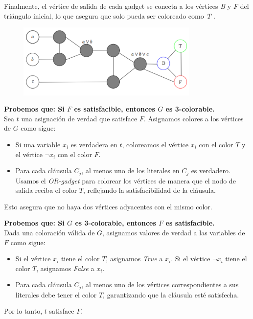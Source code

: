 \documentclass[a4paper,12pt]{article}
\begin{document}
\newpage

Finalmente, el vértice de salida de cada gadget se conecta a los vértices \textit{B} y \textit{F} del triángulo inicial, lo
que asegura que solo pueda ser coloreado como \textit{T} .

\begin{figure}[h]
    \centering
    \includegraphics[width=0.8\textwidth]{assets/3-colTFBOR.png}
\end{figure}

\textbf{Probemos que: Si $F$ es satisfacible, entonces $G$ es 3-colorable.}\\
Sea $t$ una asignaci\'on de verdad que satisface $F$. Asignamos colores a los v\'ertices de $G$ como sigue:
\begin{itemize}
    \item Si una variable $x_i$ es verdadera en $t$, coloreamos el v\'ertice $x_i$ con el color $T$ y el v\'ertice $\neg x_i$ con el color $F$.
    \item Para cada cl\'ausula $C_j$, al menos uno de los literales en $C_j$ es verdadero. Usamos el \textit{OR-gadget} para colorear los v\'ertices de manera que el nodo de salida reciba el color $T$, reflejando la satisfacibilidad de la cl\'ausula.
\end{itemize}
Esto asegura que no haya dos v\'ertices adyacentes con el mismo color.

\textbf{Probemos que: Si $G$ es 3-colorable, entonces $F$ es satisfacible.}\\
Dada una coloraci\'on v\'alida de $G$, asignamos valores de verdad a las variables de $F$ como sigue:
\begin{itemize}
    \item Si el v\'ertice $x_i$ tiene el color $T$, asignamos \textit{True} a $x_i$. Si el v\'ertice $\neg x_i$ tiene el color $T$, asignamos \textit{False} a $x_i$.
    \item Para cada cl\'ausula $C_j$, al menos uno de los v\'ertices correspondientes a sus literales debe tener el color $T$, garantizando que la cl\'ausula est\'e satisfecha.
\end{itemize}
Por lo tanto, $t$ satisface $F$.
\end{document}
